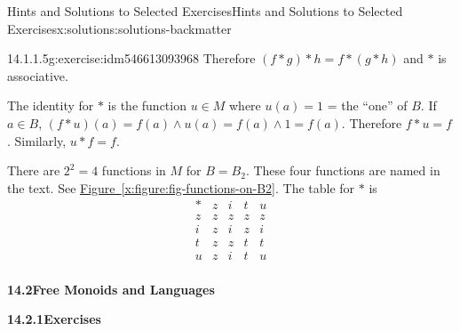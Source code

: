 \documentclass[oneside,10pt,]{book}
\newcommand{\blocktitlefont}{\relax}
\newcommand{\xreffont}{\relax}
\numberwithin{equation}{section}
\begin{document}
\begin{solutions-chapter}{Hints and Solutions to Selected Exercises}{}{Hints and Solutions to Selected Exercises}{}{}{x:solutions:solutions-backmatter}
\begin{divisionsolution}{14.1.1.5}{}{g:exercise:idm546613093968}
Therefore \((f * g) * h =f * (g * h)\) and  \(*\) is  associative.%
\par
The identity for \(*\) is the function \(u \in  M\) where \(u(a) = 1\) = the ``one'' of \(B\). If \(a \in  B\), \((f*u)(a) =f(a)\land u(a) = f(a)\land 1 = f(a)\). Therefore \(f * u = f\). Similarly, \(u * f =f\).%
\par
There are \(2^2= 4\) functions in \(M\) for \(B = B _2\). These four functions are named in the text. See \hyperref[x:figure:fig-functions-on-B2]{Figure~{\xreffont\ref{x:figure:fig-functions-on-B2}}}. The table for \(*\) is%
\begin{equation*}
\begin{array}{c|cccc}
* &  z &  i & t &  u\\
\hline
z &z & z & z & z \\
i &z & i & z & i \\
t &z & z & t & t \\
u &z & i & t & u \\
\end{array}
\end{equation*}
%
\end{divisionsolution}%
\par\smallskip
\noindent\textbf{\Large{}14.2\space\textperiodcentered\space{}Free Monoids and Languages}
\par\smallskip
\par\smallskip
\noindent\textbf{\Large{}14.2.1\space\textperiodcentered\space{}Exercises}
\par\smallskip
{}%
\end{solutions-chapter}
\end{document}
